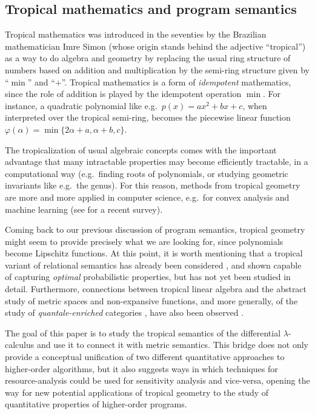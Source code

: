 \subsection{Tropical mathematics and program semantics } 


Tropical mathematics was introduced in the seventies by the Brazilian mathematician Imre Simon \cite{Simon} (whose origin stands behind the adjective ``tropical'') as a way to do algebra and geometry by replacing the usual ring structure of numbers based on addition and multiplication by the semi-ring structure given by ``$\min$'' and ``$+$''.
%
%
Tropical mathematics is a form of \emph{idempotent} mathematics, since the role of addition is 
played by the idempotent operation $\min$.
For instance, a quadratic polynomial like e.g.~$p(x)=ax^{2}+bx+c$, when interpreted over the tropical semi-ring, becomes the piecewise linear function
$
\varphi(\alpha)=\min\{2\alpha + a, \alpha+b, c\}
$.

The tropicalization of usual algebraic concepts comes with the important advantage that many intractable properties may become efficiently tractable, in a computational way (e.g.~finding roots of polynomials, or studying geometric invariants like e.g.~the genus). For this reason, methods from tropical geometry are more and more applied in computer science, e.g.~for convex analysis and machine learning (see \cite{Maragos2021} for a recent survey).

Coming back to our previous discussion of program semantics, tropical geometry might seem to provide precisely what we are looking for, since polynomials become Lipschitz functions.
At this point, it is worth mentioning that a tropical variant of relational semantics has already been considered \cite{Manzo2013}, and shown capable of capturing \emph{optimal} probabilistic properties, but has not yet been studied in detail. Furthermore, connections between tropical linear algebra and the abstract study of metric spaces and non-expansive functions, and more generally, of the study of \emph{quantale-enriched} categories \cite{Hofmann2014, Stubbe2014}, have also been observed \cite{Fuji}.

The goal of this paper is to study the tropical semantics of the differential $\lambda$-calculus and use it to connect it with metric semantics. This bridge does not only provide a conceptual unification of two different quantitative approaches to higher-order algorithms, but it also 
suggests ways in which techniques for resource-analysis could be used for sensitivity analysis and vice-versa, opening the way for new potential applications of tropical geometry to the study of quantitative properties of higher-order programs.


